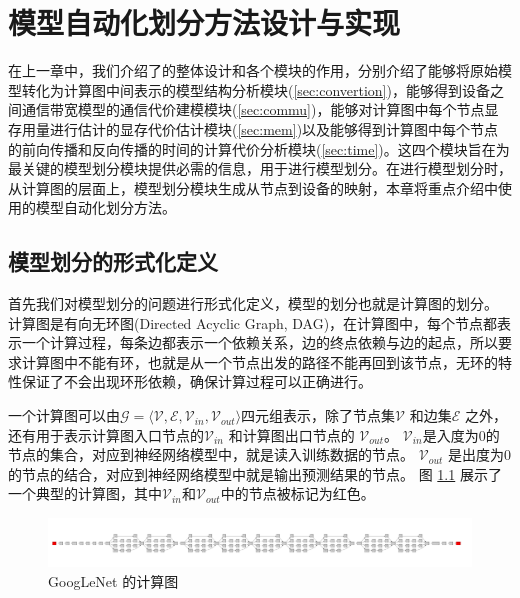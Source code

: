 \chapter{模型自动化划分方法设计与实现}
在上一章中，我们介绍了\sys{}的整体设计和各个模块的作用，分别介绍了能够将原始模型转化为计算图中间表示的模型结构分析模块(\ref{sec:convertion})，能够得到设备之间通信带宽模型的通信代价建模模块(\ref{sec:commu})，能够对计算图中每个节点显存用量进行估计的显存代价估计模块(\ref{sec:mem})以及能够得到计算图中每个节点的前向传播和反向传播的时间的计算代价分析模块(\ref{sec:time})。这四个模块旨在为最关键的模型划分模块提供必需的信息，用于进行模型划分。在进行模型划分时，从计算图的层面上，模型划分模块生成从节点到设备的映射，本章将重点介绍\sys{}中使用的模型自动化划分方法。

\section{模型划分的形式化定义}
\label{sec:formul}
首先我们对模型划分的问题进行形式化定义，模型的划分也就是计算图的划分。
计算图是有向无环图(Directed Acyclic Graph, DAG)，在计算图中，每个节点都表示一个计算过程，每条边都表示一个依赖关系，边的终点依赖与边的起点，所以要求计算图中不能有环，也就是从一个节点出发的路径不能再回到该节点，无环的特性保证了不会出现环形依赖，确保计算过程可以正确进行。

一个计算图可以由$\mathcal{G}=\langle \mathcal{V}, \mathcal{E}, \mathcal{V}_{\mathit{in}}, \mathcal{V}_{\mathit{out}} \rangle $四元组表示，除了节点集$\mathcal{V}$ 和边集$\mathcal{E}$ 之外，还有用于表示计算图入口节点的$\mathcal{V}_\mathit{in}$ 和计算图出口节点的 $\mathcal{V}_{\mathit{out}}$。
$\mathcal{V}_{\mathit{in}}$是入度为0的节点的集合，对应到神经网络模型中，就是读入训练数据的节点。
$\mathcal{V}_{\mathit{out}}$ 是出度为0的节点的结合，对应到神经网络模型中就是输出预测结果的节点。
图 \ref{fig:graph-example} 展示了一个典型的计算图，其中$\mathcal{V}_\mathit{in}$和$\mathcal{V}_\mathit{out}$中的节点被标记为红色。

\begin{figure}[h]
	\centering
	\includegraphics[width=\textwidth]{figure/4-alg/googlenet.png}
	\caption{GoogLeNet 的计算图}
	\label{fig:graph-example}
\end{figure}

